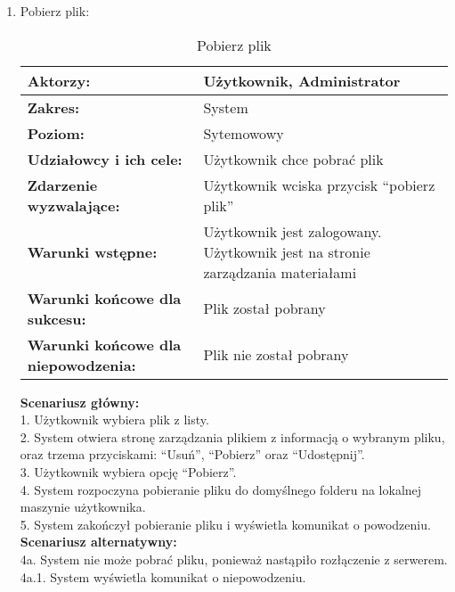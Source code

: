 \begin{enumerate}[label=(\Roman*)]
\item Pobierz plik:
	\begin{table}[H]
\centering
\caption{Pobierz plik}
\label{Pobierzplik}
\begin{tabular}{|p{7cm}|p{7cm}|}
  \hline 
  \textbf{Aktorzy:} & Użytkownik, Administrator\\
  \hline
  \textbf{Zakres:} & System \\
	\hline
  \textbf{Poziom:} & Sytemowowy \\
	\hline
  \textbf{Udziałowcy i ich cele: } & Użytkownik chce pobrać plik \\
	\hline
  \textbf{Zdarzenie wyzwalające: } & Użytkownik wciska przycisk “pobierz plik” \\
	\hline
  \textbf{Warunki wstępne: } & Użytkownik jest zalogowany. Użytkownik jest na stronie zarządzania materiałami
 \\
	\hline
  \textbf{Warunki końcowe dla sukcesu:} & Plik został pobrany\\
	\hline
  \textbf{Warunki końcowe dla niepowodzenia:} & Plik nie został pobrany \\
  \hline
\end{tabular} 
\end{table}

\textbf{Scenariusz główny:}\\
1. Użytkownik wybiera plik z listy.\\
2. System otwiera stronę zarządzania plikiem z informacją o wybranym pliku, oraz trzema przyciskami: “Usuń”, “Pobierz” oraz “Udostępnij”.\\
3. Użytkownik wybiera opcję “Pobierz”.\\
4. System rozpoczyna pobieranie pliku do domyślnego folderu na lokalnej maszynie użytkownika.\\
5. System zakończył pobieranie pliku i wyświetla komunikat o powodzeniu.\\
\textbf{Scenariusz alternatywny:}\\
4a. System nie może pobrać pliku, ponieważ nastąpiło rozłączenie z serwerem.\\
4a.1. System wyświetla komunikat o niepowodzeniu.\\


\end{enumerate}
